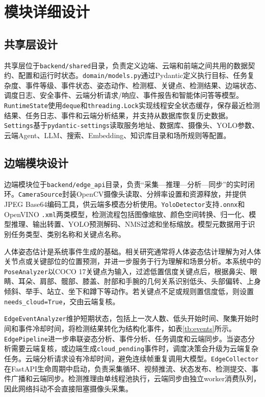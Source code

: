 \section{模块详细设计}

\subsection{共享层设计}

共享层位于\verb|backend/shared|目录，负责定义边端、云端和前端之间共用的数据契约、配置和运行时状态。\verb|domain/models.py|通过Pydantic定义执行目标、任务复杂度、事件等级、事件状态、姿态动作、检测框、关键点、检测结果、边端状态、调度日志、安全事件、云端分析请求/响应、事件报告和智能体问答等模型。\verb|RuntimeState|使用\verb|deque|和\verb|threading.Lock|实现线程安全状态缓存，保存最近检测结果、任务日志、事件和云端分析结果，并支持从数据库恢复历史数据。\verb|Settings|基于\verb|pydantic-settings|读取服务地址、数据库、摄像头、YOLO参数、云端Agent、LLM、搜索、Embedding、知识库目录和场所规则等配置。

\subsection{边端模块设计}

边端模块位于\verb|backend/edge_api|目录，负责“采集—推理—分析—同步”的实时闭环。\verb|CameraSource|封装OpenCV摄像头读取、分辨率设置和资源释放，并提供JPEG Base64编码工具，供云端多模态分析使用。\verb|YoloDetector|支持\verb|.onnx|和OpenVINO \verb|.xml|两类模型，检测流程包括图像缩放、颜色空间转换、归一化、模型推理、输出转置、YOLO预测解码、NMS过滤和坐标缩放。模型元数据用于识别任务类型、类别名称和关键点名称。

人体姿态估计是系统事件生成的基础。相关研究通常将人体姿态估计理解为对人体关节点或关键部位的位置预测，并进一步服务于行为理解和场景分析。本系统中的\verb|PoseAnalyzer|以COCO 17关键点为输入，过滤低置信度关键点后，根据鼻尖、眼睛、耳朵、肩部、髋部、膝盖、肘部和手腕的几何关系识别低头、头部偏转、上身倾斜、举手、站立、坐下和蹲下等动作。若关键点不足或规则置信度低，则设置\verb|needs_cloud=True|，交由云端复核。

\verb|EdgeEventAnalyzer|维护短期状态，包括上一次人数、低头开始时间、聚集开始时间和事件冷却时间，将检测结果转化为结构化事件，如表\ref{tb:events}所示。\verb|EdgePipeline|进一步串联姿态分析、事件分析、任务调度和云端同步。当姿态分析需要云端复核，或边端生成\verb|cloud_pending|事件时，调度决策会升级为云端复杂任务。云端分析请求设有冷却时间，避免连续帧重复调用大模型。\verb|EdgeCollector|在FastAPI生命周期中启动，负责采集循环、视频推流、状态发布、检测提交、事件广播和云端同步。检测推理由单线程池执行，云端同步由独立worker消费队列，因此网络抖动不会直接阻塞摄像头采集。

